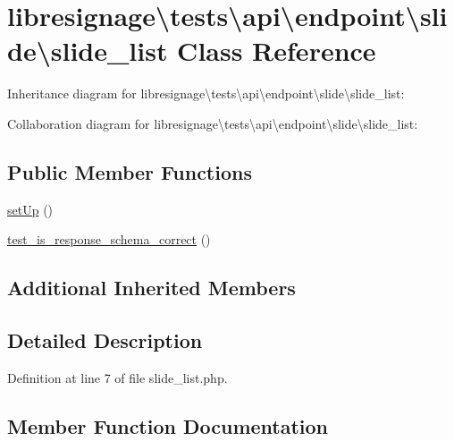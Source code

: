 \hypertarget{classlibresignage_1_1tests_1_1api_1_1endpoint_1_1slide_1_1slide__list}{}\section{libresignage\textbackslash{}tests\textbackslash{}api\textbackslash{}endpoint\textbackslash{}slide\textbackslash{}slide\+\_\+list Class Reference}
\label{classlibresignage_1_1tests_1_1api_1_1endpoint_1_1slide_1_1slide__list}


Inheritance diagram for libresignage\textbackslash{}tests\textbackslash{}api\textbackslash{}endpoint\textbackslash{}slide\textbackslash{}slide\+\_\+list\+:


Collaboration diagram for libresignage\textbackslash{}tests\textbackslash{}api\textbackslash{}endpoint\textbackslash{}slide\textbackslash{}slide\+\_\+list\+:
\subsection*{Public Member Functions}
\begin{DoxyCompactItemize}
\item 
\hyperlink{classlibresignage_1_1tests_1_1api_1_1endpoint_1_1slide_1_1slide__list_ac3e9c031d66f1451523c9bc863c09085}{set\+Up} ()
\item 
\hyperlink{classlibresignage_1_1tests_1_1api_1_1endpoint_1_1slide_1_1slide__list_a533866ceff6044d251aa8a5e4aa9bd41}{test\+\_\+is\+\_\+response\+\_\+schema\+\_\+correct} ()
\end{DoxyCompactItemize}
\subsection*{Additional Inherited Members}


\subsection{Detailed Description}


Definition at line 7 of file slide\+\_\+list.\+php.



\subsection{Member Function Documentation}
\mbox{\label{classlibresignage_1_1tests_1_1api_1_1endpoint_1_1slide_1_1slide__list_ac3e9c031d66f1451523c9bc863c09085}} 

